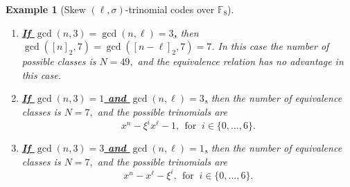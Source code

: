 \documentclass[12pt,paper]{article}
\theoremstyle{plain}
\newtheorem{example}[theorem]{Example}
\begin{document}
\begin{example}[Skew $(\ell,\sigma)$-trinomial  codes  over $\mathbb{F}_{8}$]
\begin{enumerate}
\begin{enumerate}
    \item \underline{ \textbf{If $\gcd(n,3)= \gcd(n,\ell)=3$,}} then $\gcd([n]_2, 7)= \gcd([n-\ell]_2, 7) = 7$.  In this case the number of possible classes is $N=49,$ and the equivalence relation has no advantage in this case.
    \item \underline{\textbf{If  $\gcd(n,3)= 1 $ and $ \gcd(n,\ell)=3$,}}  then the number of equivalence classes is $N=7,$ and the possible trinomials are 
    $$   x^n-\xi^i x^{\ell}- 1,  \ \ \text{for  }\  i \in \{0,\ldots, 6\}. $$

    \item  \underline{\textbf{If  $  \gcd(n,3)= 3 $ and $ \gcd(n,\ell)=1$,}} then the number of equivalence classes is $N=7,$ and the possible trinomials are 
    $$x^n- x^{\ell}- \xi^i,  \ \ \text{for  }\  i \in \{0,\ldots, 6\}. $$
   

     \end{enumerate}
 \end{enumerate}
 \end{example}
\end{document}

